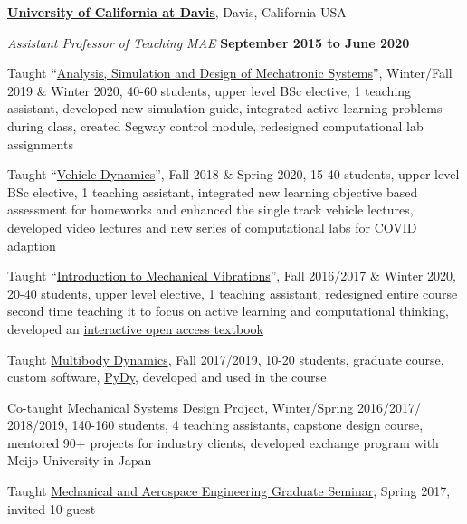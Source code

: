 \documentclass[10pt]{article}
\newenvironment{outerlist}[1][\enskip\textbullet]%
        {\begin{itemize}[#1]}{\end{itemize}%
         \vspace{-.6\baselineskip}}
\newenvironment{innerlist}[1][\enskip\textbullet]%
        {\begin{compactitem}[#1]}{\end{compactitem}}
\begin{document}
\href{http://www.ucdavis.edu}{\textbf{University of California at Davis}}, Davis, California USA
\begin{outerlist}
  \item[] \textit{Assistant Professor of Teaching MAE}%
    \hfill \textbf{September 2015 to June 2020}
    \begin{innerlist}
      \item Taught ``\href{https://moorepants.github.io/eme171/}{Analysis,
        Simulation and Design of Mechatronic Systems}'', Winter/Fall 2019 \&
        Winter 2020, 40-60 students, upper level BSc elective, 1 teaching
        assistant, developed new simulation guide, integrated active learning
        problems during class, created Segway control module, redesigned
        computational lab assignments
      \item Taught ``\href{https://moorepants.github.io/eme134/}{Vehicle
        Dynamics}'', Fall 2018 \& Spring 2020, 15-40 students, upper level
        BSc elective, 1 teaching assistant, integrated new learning objective based
        assessment for homeworks and enhanced the single track vehicle
        lectures, developed video lectures and new series of computational labs
        for COVID adaption
      \item Taught ``\href{https://moorepants.github.io/eng122/}{Introduction
        to Mechanical Vibrations}'', Fall 2016/2017 \& Winter 2020, 20-40
        students, upper level elective, 1 teaching assistant, redesigned entire
        course second time teaching it to focus on active learning and
        computational thinking, developed an
        \href{https://moorepants.github.io/resonance/}{interactive open access
        textbook}
      \item Taught \href{https://moorepants.github.io/mae223/}{Multibody
        Dynamics}, Fall 2017/2019, 10-20 students, graduate course, custom
        software, \href{http://pydy.org}{PyDy}, developed and used in the
        course
      \item Co-taught \href{https://moorepants.github.io/eme185/}{Mechanical
        Systems Design Project}, Winter/Spring 2016/2017/ 2018/2019, 140-160
        students, 4 teaching assistants, capstone design course, mentored 90+
        projects for industry clients, developed exchange program with Meijo
        University in Japan
      \item Taught \href{https://moorepants.github.io/mae297/}{Mechanical and
        Aerospace Engineering Graduate Seminar}, Spring 2017, invited 10 guest

\end{innerlist}
\end{outerlist}
\end{document}
